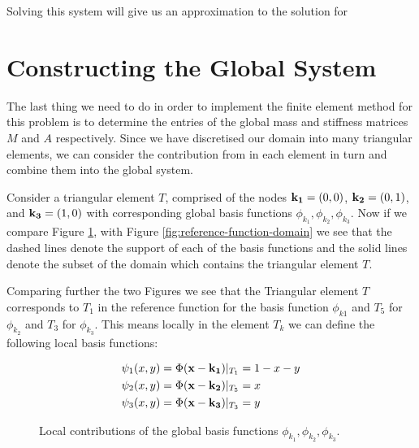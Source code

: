 Solving this system will give us an approximation to the solution for

\section{Constructing the Global System}

The last thing we need to do in order to implement the finite element method
for this problem is to determine the entries of the global mass and stiffness
matrices $M$ and $A$ respectively. Since we have discretised our domain into
many triangular elements, we can consider the contribution from in each element
in turn and combine them into the global system.

Consider a triangular element $T$, comprised of the nodes $\mathbf{k_1} = (0,0)$,
$\mathbf{k_2} = (0,1)$, and $\mathbf{k_3} = (1,0)$ with corresponding global basis functions
$\phi_{k_1}, \phi_{k_2}, \phi_{k_3}$. Now if we compare Figure
\ref{fig:twod-local-basis}, with Figure \ref{fig:reference-function-domain}
we see that the dashed lines denote the support of each of the basis functions
and the solid lines denote the subset of the domain which contains the triangular
element $T$.

Comparing further the two Figures we see that the Triangular element $T$
corresponds to $T_1$ in the reference function for the basis function $\phi_{k1}$
and $T_5$ for $\phi_{k_2}$ and $T_3$ for $\phi_{k_3}$. This means locally in the
element $T_k$ we can define the following local basis functions:

\begin{align}\label{eq:twod-local-basis}
    \begin{split}
        \psi_1(x, y) = \Phi(\mathbf{x} - \mathbf{k_1})|_{T_1} &= 1 - x - y \\
        \psi_2(x, y) = \Phi(\mathbf{x} - \mathbf{k_2})|_{T_5} &= x \\
        \psi_3(x, y) = \Phi(\mathbf{x} - \mathbf{k_3})|_{T_3} &= y
    \end{split}
\end{align}

\begin{figure}
\centering
\begin{subfigure}[b]{0.30\textwidth}
    \centering
    \resizebox{\linewidth}{!}{}
\end{subfigure}
\begin{subfigure}[b]{0.30\textwidth}
    \centering
    \resizebox{\linewidth}{!}{}
\end{subfigure}
\begin{subfigure}[b]{0.30\textwidth}
    \centering
    \resizebox{\linewidth}{!}{}
\end{subfigure}
\caption{Local contributions of the global basis functions
         $\phi_{k_1}, \phi_{k_2}, \phi_{k_3}$.}
\label{fig:twod-local-basis}
\end{figure}

